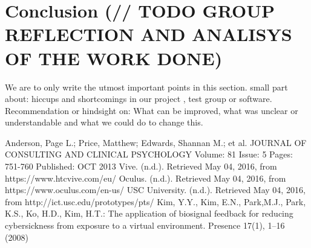 \documentclass[11pt]{article}
\begin{document}
\section{Conclusion (// TODO GROUP REFLECTION AND ANALISYS OF THE WORK DONE)}
We are to only write the utmost important points in this section. 
small part about: hiccups and shortcomings in our project , test group or software.
Recommendation or hindsight on:
What can be improved, what was unclear or understandable and what we could do to change this. 


\newpage

\begin{thebibliography}{9}
Anderson, Page L.; Price, Matthew; Edwards, Shannan M.; et al.
JOURNAL OF CONSULTING AND CLINICAL PSYCHOLOGY  Volume: 81   Issue: 5   Pages: 751-760   Published: OCT 2013
Vive. (n.d.). Retrieved May 04, 2016, from https://www.htcvive.com/eu/
Oculus. (n.d.). Retrieved May 04, 2016, from https://www.oculus.com/en-us/
USC University. (n.d.). Retrieved May 04, 2016, from http://ict.usc.edu/prototypes/pts/
Kim, Y.Y., Kim, E.N., Park,M.J., Park, K.S., Ko, H.D., Kim, H.T.: The application of biosignal
feedback for reducing cybersickness from exposure to a virtual environment. Presence 17(1),
1–16 (2008)
\end{thebibliography}
	
\end{document}
